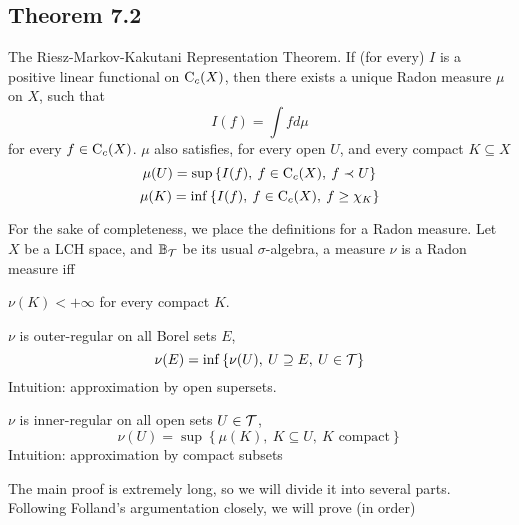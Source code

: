 \documentclass[../../main.tex]{subfiles}
\begin{document}
\subsection{Theorem 7.2}
\begin{wts}
    The Riesz-Markov-Kakutani Representation Theorem. If (for every) $I$ is a positive linear functional on $\operatorname{C}_c({X})$, then there exists a unique Radon measure $\mu$ on $X$, such that
    \[
    I(f) = \int fd\mu
    \]
    for every $f\in\operatorname{C}_c({X})$. $\mu$ also satisfies, for every open $U$, and every compact $K\subseteq X$
    \begin{equation}\label{open approximated by If}
        \mu(U) = \sup\left\{I(f),\:f\in\operatorname{C}_c({X}),\:f\prec U\right\}
    \end{equation}
    \begin{equation}\label{compact approximated by If}
        \mu(K)=\inf\left\{I(f),\:f\in\operatorname{C}_c({X}),\:f\geq\chi_K\right\}
    \end{equation}
\end{wts}
\newcommand{\borel}{\mathbb{B}_{\Tau}} %
\newcommand{\mustar}{\mu^*} %
%
For the sake of completeness, we place the definitions for a Radon measure. Let $X$ be a LCH space, and $\borel$ be its usual $\sigma$-algebra, a measure $\nu$ is a Radon measure iff
\begin{enumroman}
    \item $\nu(K)<+\infty$ for every compact $K$.
    \item $\nu$ is outer-regular on all Borel sets $E$,
    \[
    \nu(E) = \inf\left\{\nu(U),\: U\supseteq E,\:U\in\mathcal{T}\right\}
    \]
    Intuition: approximation by open supersets.
    \item $\nu$ is inner-regular on all open sets $U\in\mathcal{T}$,
    \[
    \nu(U) = \sup\left\{\mu(K),\: K\subseteq U,\:K\text{ compact}\right\}
    \]
    Intuition: approximation by compact subsets 
\end{enumroman}
%
%
The main proof is extremely long, so we will divide it into several parts. Following Folland's argumentation closely, we will prove (in order)
%
%
\end{document}
